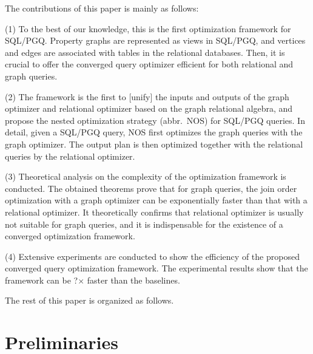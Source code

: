 \documentclass[sigconf, nonacm]{acmart}
\begin{document}
The contributions of this paper is mainly as follows:

(1) To the best of our knowledge, this is the first optimization framework for SQL/PGQ.
Property graphs are represented as views in SQL/PGQ, and vertices and edges are associated with tables in the relational databases.
Then, it is crucial to offer the converged query optimizer efficient for both relational and graph queries.

(2) The framework is the first to [unify] the inputs and outputs of the graph optimizer and relational optimizer based on the graph relational algebra, and propose the nested optimization strategy (abbr.~NOS) for SQL/PGQ queries.
In detail, given a SQL/PGQ query, NOS first optimizes the graph queries with the graph optimizer.
The output plan is then optimized together with the relational queries by the relational optimizer.

(3) Theoretical analysis on the complexity of the optimization framework is conducted.
The obtained theorems prove that for graph queries, the join order optimization with a graph optimizer can be exponentially faster than that with a relational optimizer. 
It theoretically confirms that relational optimizer is usually not suitable for graph queries, and it is indispensable for the existence of a converged optimization framework.

(4) Extensive experiments are conducted to show the efficiency of the proposed converged query optimization framework.
The experimental results show that the framework can be ?$\times$ faster than the baselines.

The rest of this paper is organized as follows.


\section{Preliminaries}
\label{sec:preliminaries}
\end{document}
